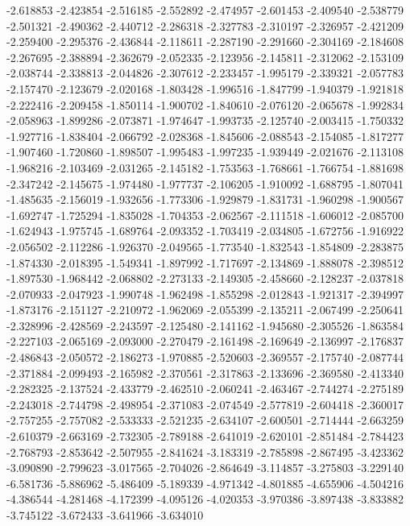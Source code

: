 -2.618853
-2.423854
-2.516185
-2.552892
-2.474957
-2.601453
-2.409540
-2.538779
-2.501321
-2.490362
-2.440712
-2.286318
-2.327783
-2.310197
-2.326957
-2.421209
-2.259400
-2.295376
-2.436844
-2.118611
-2.287190
-2.291660
-2.304169
-2.184608
-2.267695
-2.388894
-2.362679
-2.052335
-2.123956
-2.145811
-2.312062
-2.153109
-2.038744
-2.338813
-2.044826
-2.307612
-2.233457
-1.995179
-2.339321
-2.057783
-2.157470
-2.123679
-2.020168
-1.803428
-1.996516
-1.847799
-1.940379
-1.921818
-2.222416
-2.209458
-1.850114
-1.900702
-1.840610
-2.076120
-2.065678
-1.992834
-2.058963
-1.899286
-2.073871
-1.974647
-1.993735
-2.125740
-2.003415
-1.750332
-1.927716
-1.838404
-2.066792
-2.028368
-1.845606
-2.088543
-2.154085
-1.817277
-1.907460
-1.720860
-1.898507
-1.995483
-1.997235
-1.939449
-2.021676
-2.113108
-1.968216
-2.103469
-2.031265
-2.145182
-1.753563
-1.768661
-1.766754
-1.881698
-2.347242
-2.145675
-1.974480
-1.977737
-2.106205
-1.910092
-1.688795
-1.807041
-1.485635
-2.156019
-1.932656
-1.773306
-1.929879
-1.831731
-1.960298
-1.900567
-1.692747
-1.725294
-1.835028
-1.704353
-2.062567
-2.111518
-1.606012
-2.085700
-1.624943
-1.975745
-1.689764
-2.093352
-1.703419
-2.034805
-1.672756
-1.916922
-2.056502
-2.112286
-1.926370
-2.049565
-1.773540
-1.832543
-1.854809
-2.283875
-1.874330
-2.018395
-1.549341
-1.897992
-1.717697
-2.134869
-1.888078
-2.398512
-1.897530
-1.968442
-2.068802
-2.273133
-2.149305
-2.458660
-2.128237
-2.037818
-2.070933
-2.047923
-1.990748
-1.962498
-1.855298
-2.012843
-1.921317
-2.394997
-1.873176
-2.151127
-2.210972
-1.962069
-2.055399
-2.135211
-2.067499
-2.250641
-2.328996
-2.428569
-2.243597
-2.125480
-2.141162
-1.945680
-2.305526
-1.863584
-2.227103
-2.065169
-2.093000
-2.270479
-2.161498
-2.169649
-2.136997
-2.176837
-2.486843
-2.050572
-2.186273
-1.970885
-2.520603
-2.369557
-2.175740
-2.087744
-2.371884
-2.099493
-2.165982
-2.370561
-2.317863
-2.133696
-2.369580
-2.413340
-2.282325
-2.137524
-2.433779
-2.462510
-2.060241
-2.463467
-2.744274
-2.275189
-2.243018
-2.744798
-2.498954
-2.371083
-2.074549
-2.577819
-2.604418
-2.360017
-2.757255
-2.757082
-2.533333
-2.521235
-2.634107
-2.600501
-2.714444
-2.663259
-2.610379
-2.663169
-2.732305
-2.789188
-2.641019
-2.620101
-2.851484
-2.784423
-2.768793
-2.853642
-2.507955
-2.841624
-3.183319
-2.785898
-2.867495
-3.423362
-3.090890
-2.799623
-3.017565
-2.704026
-2.864649
-3.114857
-3.275803
-3.229140
-6.581736
-5.886962
-5.486409
-5.189339
-4.971342
-4.801885
-4.655906
-4.504216
-4.386544
-4.281468
-4.172399
-4.095126
-4.020353
-3.970386
-3.897438
-3.833882
-3.745122
-3.672433
-3.641966
-3.634010
